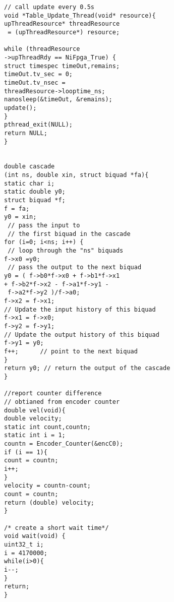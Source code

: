 \begin{verbatim}
// call update every 0.5s
void *Table_Update_Thread(void* resource){
upThreadResource* threadResource
 = (upThreadResource*) resource;

while (threadResource
->upThreadRdy == NiFpga_True) {
struct timespec timeOut,remains;
timeOut.tv_sec = 0;
timeOut.tv_nsec = 
threadResource->looptime_ns;
nanosleep(&timeOut, &remains);
update();
}
pthread_exit(NULL);
return NULL;
}


double cascade
(int ns, double xin, struct biquad *fa){
static char i;
static double y0;
struct biquad *f;
f = fa;
y0 = xin;            	
 // pass the input to 
 // the first biquad in the cascade
for (i=0; i<ns; i++) {   
 // loop through the "ns" biquads
f->x0 =y0;      	  
 // pass the output to the next biquad
y0 = ( f->b0*f->x0 + f->b1*f->x1 
+ f->b2*f->x2 - f->a1*f->y1 -
 f->a2*f->y2 )/f->a0;
f->x2 = f->x1;  	 
// Update the input history of this biquad
f->x1 = f->x0;
f->y2 = f->y1;  
// Update the output history of this biquad
f->y1 = y0;
f++;      // point to the next biquad
}
return y0; // return the output of the cascade
}

//report counter difference 
// obtianed from encoder counter
double vel(void){
double velocity;
static int count,countn;
static int i = 1;
countn = Encoder_Counter(&encC0);
if (i == 1){
count = countn;
i++;
}
velocity = countn-count;
count = countn;
return (double) velocity;
}

/* create a short wait time*/
void wait(void) {
uint32_t i;
i = 4170000;
while(i>0){
i--;
}
return;
}



\end{verbatim}